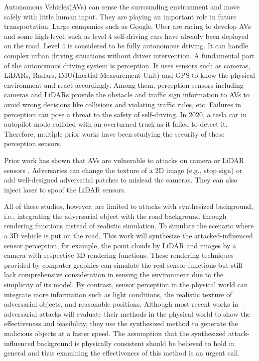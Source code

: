 
Autonomous Vehicles(AVs) can sense the surrounding environment and move safely with little human input.
They are playing an important role in future transportation. Large companies such as Google,
Uber\cite{1} are racing to develop AVs and some high-level, such as level 4 self-driving cars have already been deployed on the road. 
Level 4 is considered to be fully autonomous driving. It can handle complex urban driving situations without driver intervention. 
A fundamental part of the autonomous driving system is perception.
It uses sensors\cite{17} such as cameras, LiDARs, Radars, IMU(Inertial
Measurement Unit) and GPS to know the physical environment and react accordingly. Among them, perception sensors
including cameras and LiDARs provide the obstacle and traffic sign information to AVs to avoid wrong decisions like
collisions and violating traffic rules, etc. 
Failures in perception can pose a threat to the safety of self-driving. 
In 2020, a tesla car in autopilot mode collided with an overturned truck as it failed to detect it.
Therefore, multiple prior works have been studying the security of these perception sensors.

Prior work has shown that AVs are vulnerable to attacks
on camera \cite{7, 9, 23} or LiDAR sensors \cite{4, 6, 19, 25}.
Adversaries can change the texture of a 2D image \cite{23}(e.g.,
stop sign) or add well-designed adversarial patches\cite{9} to
mislead the cameras. They can also inject laser\cite{6} to spoof
the LiDAR sensors.

All of these studies, however, are limited to attacks with synthesized background, 
i.e., integrating the adversarial object with the road background through rendering functions instead of realistic simulation\cite{23, 25, msf-adv, black-lidar, 19}.
To simulate the scenario where a 3D vehicle is put on the road, 
This work will synthesize the attacked-influenced sensor perception, for example, the point clouds by LiDAR and images by a camera with respective 3D rendering functions.
These rendering techniques provided by computer graphics can simulate the real sensor functions
but still lack comprehensive consideration in sensing the environment due to the simplicity of its model.
By contrast, sensor perception in the physical world can integrate more information such as light conditions, the realistic texture of adversarial objects, and reasonable positions.
Although most recent works in adversarial attacks will evaluate their methods in the physical world to show the effectiveness and feasibility,
they use the synthesized method to generate the malicious objects at a faster speed.
The assumption that the synthesized attack-influenced background is physically consistent should be believed to hold in general\cite{msf-adv} and thus examining the effectiveness of this method is an urgent call.

